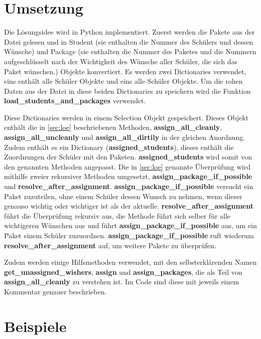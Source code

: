 \documentclass[a4paper,10pt,ngerman]{scrartcl}
\begin{document}
\section{Umsetzung}

Die Lösungsidee wird in Python implementiert.
Zuerst werden die Pakete aus der Datei gelesen und in Student (sie enthalten die Nummer des Schülers und dessen Wünsche) und Package (sie enthalten die Nummer des Paketes und die Nummern aufgeschlüsselt nach der Wichtigkeit des Wünsche aller Schüler, die sich das Paket wünschen.) Objekte konvertiert.
Es werden zwei Dictionaries verwendet, eins enthält alle Schüler Objekte und eins alle Schüler Objekte.
Um die rohen Daten aus der Datei in diese beiden Dictionaries zu speichern wird die Funktion \textbf{load\_students\_and\_packages} verwendet.

Diese Dictionaries werden in einem Selection Objekt gespeichert.
Dieses Objekt enthält die in \autoref{sec:loe} beschriebenen Methoden, \textbf{assign\_all\_cleanly}, \textbf{assign\_all\_uncleanly} und \textbf{assign\_all\_dirtily} in der gleichen Anordnung.
Zudem enthält es ein Dictionary (\textbf{assigned\_students}), dieses enthält die Zuordnungen der Schüler mit den Paketen.
\textbf{assigned\_students} wird somit von den genannten Methoden angepasst.
Die in \autoref{sec:loe} genannte Überprüfung wird mithilfe zweier rekursiver Methoden umgesetzt, \textbf{assign\_package\_if\_possible} und \textbf{resolve\_after\_assignment}.
\textbf{assign\_package\_if\_possible} versucht ein Paket zuzuteilen, ohne einem Schüler dessen Wunsch zu nehmen, wenn dieser genauso wichtig oder wichtiger ist als der aktuelle.
\textbf{resolve\_after\_assignment} führt die Überprüfung rekursiv aus, die Methode führt sich selber für alle wichtigeren Wünschen aus und führt \textbf{assign\_package\_if\_possible} aus, um ein Paket einem Schüler zuzuordnen.
\textbf{assign\_package\_if\_possible} ruft wiederum \textbf{resolve\_after\_assignment} auf, um weitere Pakete zu überprüfen.

Zudem werden einige Hilfsmethoden verwendet, mit den selbsterklärenden Namen \textbf{get\_unassigned\_wishers}, \textbf{assign} und \textbf{assign\_packages}, die als Teil von \textbf{assign\_all\_cleanly} zu verstehen ist.
Im Code sind diese mit jeweils einem Kommentar genauer beschrieben.

\section{Beispiele}
\end{document}
